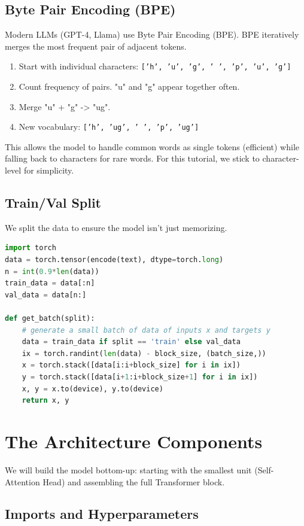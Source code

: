 \subsection{Byte Pair Encoding (BPE)}
Modern LLMs (GPT-4, Llama) use Byte Pair Encoding (BPE). BPE iteratively merges the most frequent pair of adjacent tokens.
\begin{enumerate}
    \item Start with individual characters: \texttt{['h', 'u', 'g', ' ', 'p', 'u', 'g']}
    \item Count frequency of pairs. "u" and "g" appear together often.
    \item Merge "u" + "g" -> "ug".
    \item New vocabulary: \texttt{['h', 'ug', ' ', 'p', 'ug']}
\end{enumerate}
This allows the model to handle common words as single tokens (efficient) while falling back to characters for rare words. For this tutorial, we stick to character-level for simplicity.

\subsection{Train/Val Split}
We split the data to ensure the model isn't just memorizing.

\begin{lstlisting}[language=Python]
import torch
data = torch.tensor(encode(text), dtype=torch.long)
n = int(0.9*len(data))
train_data = data[:n]
val_data = data[n:]

def get_batch(split):
    # generate a small batch of data of inputs x and targets y
    data = train_data if split == 'train' else val_data
    ix = torch.randint(len(data) - block_size, (batch_size,))
    x = torch.stack([data[i:i+block_size] for i in ix])
    y = torch.stack([data[i+1:i+block_size+1] for i in ix])
    x, y = x.to(device), y.to(device)
    return x, y
\end{lstlisting}

\section{The Architecture Components}

We will build the model bottom-up: starting with the smallest unit (Self-Attention Head) and assembling the full Transformer block.

\subsection{Imports and Hyperparameters}

